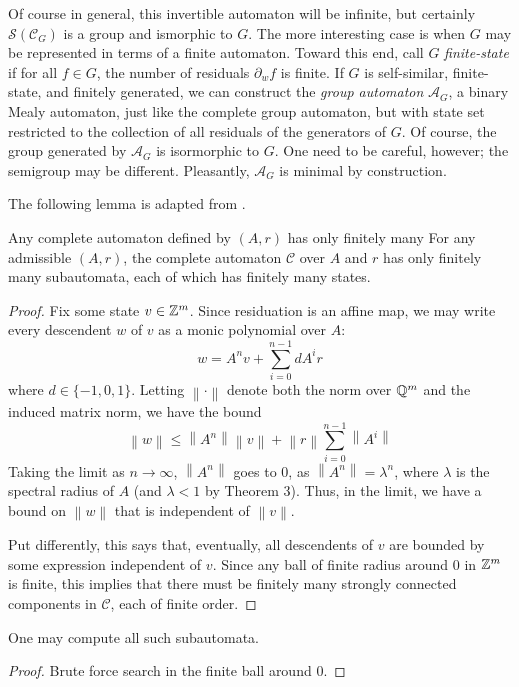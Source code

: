 \documentclass[11pt, titlepage]{article}
\newcommand{\norm}[1]{\left\lVert#1\right\rVert}
\begin{document}
Of course in general,
this invertible automaton will be infinite, but certainly
$\mathcal{S}(\mathcal{C}_G)$ is a group and ismorphic to $G$. The more
interesting case is when $G$ may be represented in terms of a finite
automaton. Toward this end, call $G$ \emph{finite-state} if for all
$f \in G$, the number of residuals $\partial_w f$ is finite. If $G$ is
self-similar, finite-state, and finitely generated, we can construct
the \emph{group automaton} $\mathcal{A}_G$, a binary Mealy automaton,
just like the complete group automaton, but with state set restricted
to the collection of all residuals of the generators of $G$. Of
course, the group generated by $\mathcal{A}_G$ is isormorphic to
$G$. One need to be careful, however; the semigroup may be
different. Pleasantly, $\mathcal{A}_G$ is minimal by construction.

The following lemma is adapted from \cite{okano:thesis}. 

\begin{lemma}
  Any complete automaton defined by $(A, r)$ has only finitely many
  For any admissible $(A, r)$, the complete automaton $\mathcal{C}$
  over $A$ and $r$ has only finitely many subautomata, each of which
  has finitely many states.
\end{lemma}
\begin{proof}
  Fix some state $v \in \mathbb{Z}^m$. Since residuation is an affine map, we
  may write every descendent $w$ of $v$ as a monic polynomial over $A$:
  \[
    w = A^nv + \sum_{i = 0}^{n-1}d A^i r
  \]
  where $d \in \{-1, 0, 1\}$. Letting $\norm{\cdot}$ denote both the
  norm over $\mathbb{Q}^m$ and the induced matrix norm, we have the bound
  \[
    \norm{w} \leq \norm{A^n}\norm{v} + \norm{r} \sum_{i=0}^{n-1} \norm{A^i}
  \]
  Taking the limit as $n\rightarrow\infty$, $\norm{A^n}$ goes to 0, as
  $\norm{A^n} = \lambda^n$, where $\lambda$ is the spectral radius of
  $A$ (and $\lambda < 1$ by Theorem 3). Thus, in the limit, we have a
  bound on $\norm{w}$ that is independent of $\norm{v}$.

  Put differently, this says that, eventually, all descendents of $v$
  are bounded by some expression independent of $v$. Since any ball of
  finite radius around 0 in $\mathbb{Z}^m$ is finite, this implies that there
  must be finitely many strongly connected components in
  $\mathcal{C}$, each of finite order.
\end{proof}

\begin{lemma}
  One may compute all such subautomata.
\end{lemma}
\begin{proof}
  Brute force search in the finite ball around 0.
\end{proof}
\end{document}
